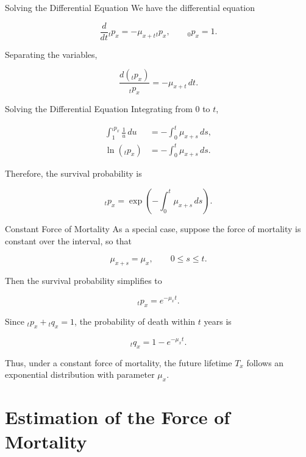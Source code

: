 \documentclass[
  ignorenonframetext,
  aspectratio=169,
]{beamer}
\begin{document}
\begin{frame}{Solving the Differential Equation}
\protect{}\label{solving-the-differential-equation}
We have the differential equation

\[
\frac{d}{dt}{}_tp_x
=-\mu_{x+t}{}_tp_x,
\qquad {}_0p_x=1.
\]

Separating the variables,

\[
\frac{d({}_tp_x)}{{}_tp_x}
=-\mu_{x+t}\,dt.
\]
\end{frame}

\begin{frame}{Solving the Differential Equation}
\protect{}\label{solving-the-differential-equation-1}
Integrating from \(0\) to \(t\),

\[
\begin{aligned}
\int_1^{{}_tp_x}\frac{1}{u}\,du
&=-\int_0^t\mu_{x+s}\,ds,\\
\ln({}_tp_x)
&=-\int_0^t\mu_{x+s}\,ds.
\end{aligned}
\]

Therefore, the survival probability is

\[
\boxed{
{}_tp_x
=
\exp\left(-\int_0^t\mu_{x+s}\,ds\right).
}
\]
\end{frame}

\begin{frame}{Constant Force of Mortality}
\protect{}\label{constant-force-of-mortality}
As a special case, suppose the force of mortality is constant over the
interval, so that

\[
\mu_{x+s}=\mu_x,
\qquad 0\leq s\leq t.
\]

Then the survival probability simplifies to

\[
\boxed{{}_tp_x=e^{-\mu_xt}.}
\]

Since \({}_tp_x+{}_tq_x=1\), the probability of death within \(t\) years
is

\[
\boxed{{}_tq_x=1-e^{-\mu_xt}.}
\]

Thus, under a constant force of mortality, the future lifetime \(T_x\)
follows an exponential distribution with parameter \(\mu_x\).
\end{frame}

\section{Estimation of the Force of
Mortality}\label{estimation-of-the-force-of-mortality}
\end{document}
